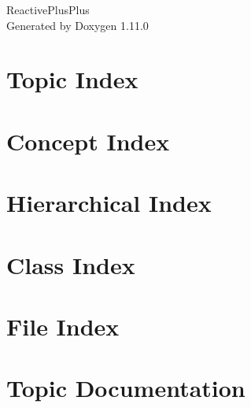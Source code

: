 \documentclass[twoside]{book}
\newcommand{\+}{\discretionary{\mbox{\scriptsize$\hookleftarrow$}}{}{}}
\newcommand{\clearemptydoublepage}{%
    \newpage{\pagestyle{empty}\cleardoublepage}%
  }
\begin{document}
  \raggedbottom
    \hypersetup{pageanchor=false,
                bookmarksnumbered=true,
                pdfencoding=unicode
               }
  \begin{titlepage}
  \vspace*{7cm}
  \begin{center}%
  {\Large Reactive\+Plus\+Plus}\\
  \vspace*{1cm}
  {\large Generated by Doxygen 1.11.0}\\
  \end{center}
  \end{titlepage}
  \clearemptydoublepage
  \tableofcontents
  \clearemptydoublepage
  \hypersetup{pageanchor=true}

\chapter{Topic Index}

\chapter{Concept Index}

\chapter{Hierarchical Index}

\chapter{Class Index}

\chapter{File Index}

\chapter{Topic Documentation}



\end{document}
